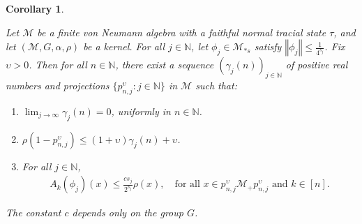 \documentclass[11pt]{amsart}
\newtheorem{cor}[thm]{Corollary}
\theoremstyle{definition}
\theoremstyle{myremark}
\numberwithin{equation}{section}
\def\N{\mathbb N}
\newcommand{\CM}{\mathcal{M}}
\newcommand{\ups}{\upsilon}
\newcommand{\norm}[1]{\left\Vert#1\right\Vert}
\begin{document}
\begin{cor}\label{maximal ineq for averages-cor}


Let $\CM$ be a finite von Neumann algebra with a faithful normal tracial state $\tau$, and let $(\CM, G, \alpha, \rho)$ be a kernel. For all $j \in \N$, let $\phi_j \in \CM_{* s}$ satisfy $\norm{\phi_j} \leq \frac{1}{4^{s_j}}$. Fix $ \ups > 0$. Then for all $n \in \N$, there exist a sequence $\left(\gamma_j(n)\right)_{j \in \N}$ of positive real numbers and projections $\{p^{\ups}_{n,j} : j \in \N\}$ in $\CM$ such that:
	\begin{enumerate}\setlength\itemsep{.7em} 
		\item $ \displaystyle \lim_{j \to \infty} \gamma_j(n) = 0$, uniformly in $n \in \N$.  
		\item $\rho(1 - p^{ \ups}_{n,j}) \leq (1 + \ups)\gamma_j(n) + \ups$.  
		\item For all $j \in \N$,
		\begin{align}\label{max-cond}
		    A_k(\phi_j)(x) \leq  \frac{c s_j}{2^{s_j}} \rho(x), \quad \text{for all } x \in p^{ \ups}_{n,j} \CM_+ p^{\ups}_{n,j} \text{ and } k \in [n].
		\end{align}
	\end{enumerate}
	The constant $c$ depends only on the group $G$.






\end{cor}
\end{document}
